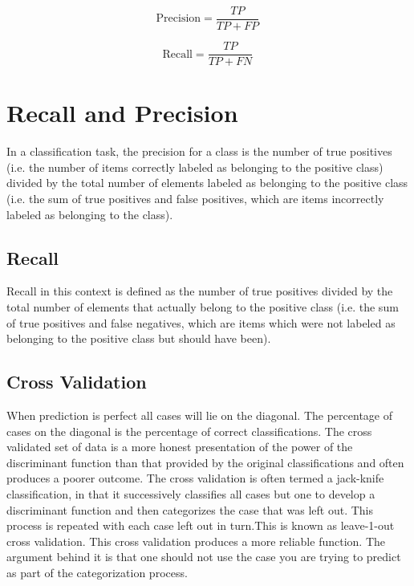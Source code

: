 \documentclass[]{report}
\begin{document}
\begin{equation}
\text{Precision}=\frac{TP}{TP+FP} \, 
\end{equation}

\begin{equation}
\text{Recall}=\frac{TP}{TP+FN} \, 
\end{equation}
\section{Recall and Precision}
In a classification task, the precision for a class is the number of true positives (i.e. the number of items correctly labeled as belonging to the positive class) divided by the total number of elements labeled as belonging to the positive class (i.e. the sum of true positives and false positives, which are items incorrectly labeled as belonging to the class). 


\subsection*{Recall}
Recall in this context is defined as the number of true positives divided by the total number of elements that actually belong to the positive class (i.e. the sum of true positives and false negatives, which are items which were not labeled as belonging to the positive class but should have been).

\subsection*{ Cross Validation}
When prediction
is perfect all cases will lie on the diagonal. The percentage of cases on the
diagonal is the percentage of correct classifications. The cross validated set of
data is a more honest presentation of the power of the discriminant function
than that provided by the original classifications and often produces a poorer
outcome. The cross validation is often termed a jack-knife classification, in
that it successively classifies all cases but one to develop a discriminant
function and then categorizes the case that was left out. This process is
repeated with each case left out in turn.This is known as leave-1-out cross
validation.
This cross validation produces a more reliable function. The argument
behind it is that one should not use the case you are trying to predict as part
of the categorization process.
\end{document}

